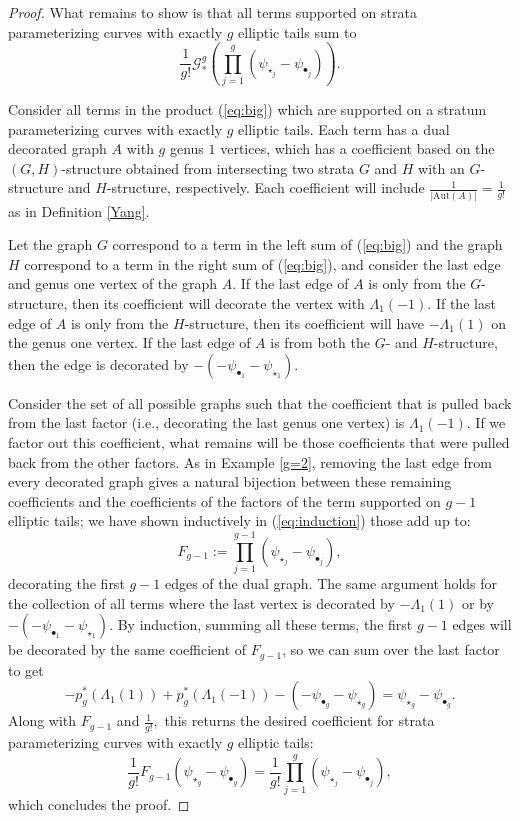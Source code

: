 \documentclass[leqno,12pt]{amsart}
\theoremstyle{remark}
\numberwithin{equation}{section}
\begin{document}
\begin{proof}
What remains to show is that all terms supported on strata parameterizing curves with exactly $g$ elliptic tails sum to 
$$
\frac{1}{g!}\mathcal{G}_*^g\left(\prod_{j=1}^g(\psi_{\star_j}-\psi_{\bullet_j})\right).
$$

Consider all terms in the product (\ref{eq:big}) which are supported on a stratum parameterizing curves with exactly $g$ elliptic tails. Each term has a dual decorated graph $A$ with $g$ genus $1$ vertices, which has a coefficient based on the $(G, H)$-structure obtained from intersecting two strata $G$ and $H$ with an $G$-structure and $H$-structure, respectively. Each coefficient will include $\frac{1}{|\text{Aut}(A)|} = \frac{1}{g!}$ as in Definition \ref{Yang}.

Let the graph $G$ correspond to a term in the left sum of (\ref{eq:big}) and the graph $H$ correspond to a term in the right sum of (\ref{eq:big}), and consider the last edge and genus one vertex of the graph $A$. If the last edge of $A$ is only from the $G$-structure, then its coefficient will decorate the vertex with  $\Lambda_1(-1)$. If the last edge of $A$ is only from the $H$-structure, then its coefficient will have $-\Lambda_1(1)$ on the genus one vertex. If the last edge of $A$ is from both the $G$- and $H$-structure, then the edge is decorated by $-(-\psi_{\bullet_1} -\psi_{\star_1})$.

Consider the set of all possible graphs such that the coefficient that is pulled back from the last factor (i.e., decorating the last genus one vertex) is $\Lambda_1(-1).$ If we factor out this coefficient, what remains will be those coefficients that were pulled back from the other factors. As in Example \ref{g=2}, removing the last edge from every decorated graph gives a natural bijection between these remaining coefficients and the coefficients of the factors of the term supported on $g-1$ elliptic tails; we have shown inductively in (\ref{eq:induction}) those add up to:
$$
F_{g-1} := \prod_{j=1}^{g-1}(\psi_{\star_j}-\psi_{\bullet_j}),
$$
decorating the first $g-1$ edges of the dual graph. The same argument holds for the collection of all terms where the last vertex is decorated by $-\Lambda_1(1)$ or by $-(-\psi_{\bullet_1} -\psi_{\star_1})$. By induction, summing all these terms, the first $g-1$ edges  will be decorated by the same coefficient of $F_{g-1}$, so we can sum over the last factor to get 
$$
-p_g^\ast(\Lambda_{1}(1)) + p_g^\ast(\Lambda_{1}(-1)) - (-\psi_{\bullet_g}-\psi_{\star_g}) = \psi_{\star_g}-\psi_{\bullet_g}.
$$
Along with $F_{g-1}$ and $\frac{1}{g!},$ this returns the desired coefficient for strata parameterizing curves with exactly $g$ elliptic tails: 
$$\frac{1}{g!}F_{g-1}(\psi_{\star_g}-\psi_{\bullet_g}) = \frac{1}{g!}\prod_{j=1}^{g}(\psi_{\star_j}-\psi_{\bullet_j}),
$$
which concludes the proof.
\end{proof}
\end{document}
